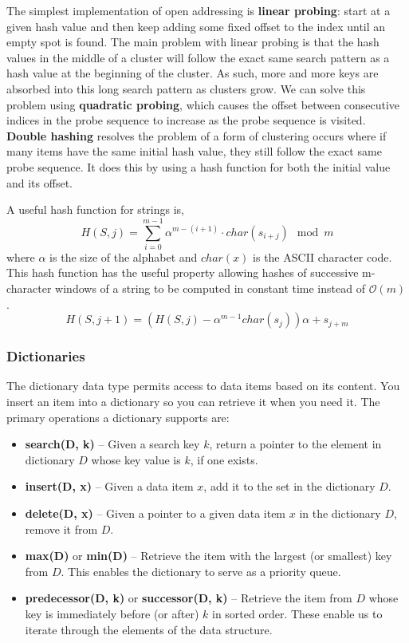 \documentclass{article}
\newcommand{\bigO}{\ensuremath{\mathcal{O}}}
\begin{document}
    The simplest implementation of open addressing is \textbf{linear probing}: start at a given hash value and then keep adding some fixed offset to the index until an empty spot is found. The main problem with linear probing is that the hash values in the middle of a cluster will follow the exact same search pattern as a hash value at the beginning of the cluster. As such, more and more keys are absorbed into this long search pattern as clusters grow. We can solve this problem using \textbf{quadratic probing}, which causes the offset between consecutive indices in the probe sequence to increase as the probe sequence is visited. \textbf{Double hashing} resolves the problem of a form of clustering occurs where if many items have the same initial hash value, they still follow the exact same probe sequence. It does this by using a hash function for both the initial value and its offset.

    A useful hash function for strings is,
    \[
        H(S,j) = \sum_{i=0}^{m-1} \alpha^{m-(i+1)} \cdot char(s_{i+j}) \mod m
    \]
    where $\alpha$ is the size of the alphabet and $char(x)$ is the ASCII character code. This hash function has the useful property allowing hashes of successive m-character windows of a string to be computed in constant time instead of $\bigO(m)$.
    \[
        H(S, j+1) = (H(S,j) - \alpha^{m-1}char(s_j))\alpha + s_{j+m}
    \]
    
    \subsubsection{Dictionaries}
    The dictionary data type permits access to data items based on its content. You insert an item into a dictionary so you can retrieve it when you need it. The primary operations a dictionary supports are:
    \begin{itemize}
        \item  \textbf{search(D, k)} – Given a search key $k$, return a pointer to the element in dictionary $D$ whose key value is $k$, if one exists.
        \item \textbf{insert(D, x)} – Given a data item $x$, add it to the set in the dictionary $D$.
        \item \textbf{delete(D, x)} – Given a pointer to a given data item $x$ in the dictionary $D$, remove it from $D$.
        \item \textbf{max(D)} or \textbf{min(D)} – Retrieve the item with the largest (or smallest) key from $D$. This enables the dictionary to serve as a priority queue.
        \item \textbf{predecessor(D, k)} or \textbf{successor(D, k)} – Retrieve the item from $D$ whose key is immediately before (or after) $k$ in sorted order. These enable us to iterate through the elements of the data structure.
    \end{itemize}
    
\end{document}
